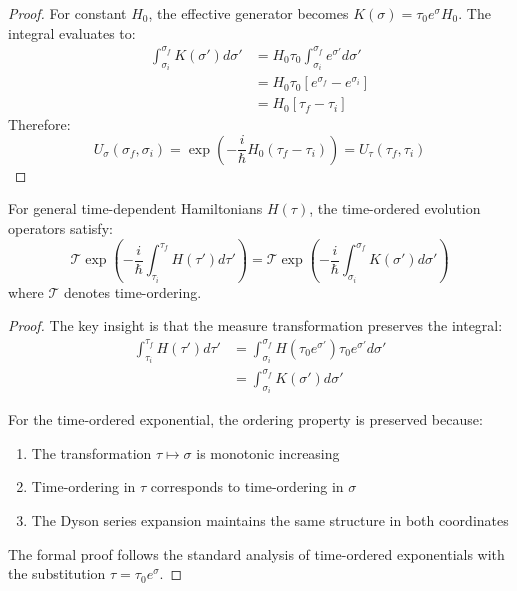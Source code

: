 \begin{proof}
For constant $H_0$, the effective generator becomes $K(\sigma) = \tau_0 e^\sigma H_0$. The integral evaluates to:
\begin{align}
\int_{\sigma_i}^{\sigma_f} K(\sigma') d\sigma' &= H_0 \tau_0 \int_{\sigma_i}^{\sigma_f} e^{\sigma'} d\sigma' \\
&= H_0 \tau_0 [e^{\sigma_f} - e^{\sigma_i}] \\
&= H_0 [\tau_f - \tau_i]
\end{align}
Therefore:
\begin{equation}
U_\sigma(\sigma_f, \sigma_i) = \exp\left(-\frac{i}{\hbar} H_0 (\tau_f - \tau_i)\right) = U_\tau(\tau_f, \tau_i)
\end{equation}
\end{proof}

\begin{theorem}
\label{thm:unitary_equiv_time_dependent}
For general time-dependent Hamiltonians $H(\tau)$, the time-ordered evolution operators satisfy:
\begin{equation}
\mathcal{T} \exp\left(-\frac{i}{\hbar}\int_{\tau_i}^{\tau_f} H(\tau') d\tau'\right) = \mathcal{T} \exp\left(-\frac{i}{\hbar}\int_{\sigma_i}^{\sigma_f} K(\sigma') d\sigma'\right)
\end{equation}
where $\mathcal{T}$ denotes time-ordering.
\end{theorem}

\begin{proof}
The key insight is that the measure transformation preserves the integral:
\begin{align}
\int_{\tau_i}^{\tau_f} H(\tau') d\tau' &= \int_{\sigma_i}^{\sigma_f} H(\tau_0 e^{\sigma'}) \tau_0 e^{\sigma'} d\sigma' \\
&= \int_{\sigma_i}^{\sigma_f} K(\sigma') d\sigma'
\end{align}

For the time-ordered exponential, the ordering property is preserved because:
\begin{enumerate}
\item The transformation $\tau \mapsto \sigma$ is monotonic increasing
\item Time-ordering in $\tau$ corresponds to time-ordering in $\sigma$
\item The Dyson series expansion maintains the same structure in both coordinates
\end{enumerate}

The formal proof follows the standard analysis of time-ordered exponentials with the substitution $\tau = \tau_0 e^\sigma$.
\end{proof}

